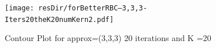\documentclass[12pt]{article}
\begin{document}









\begin{figure}
  \centering
\ifmacosx
  \texttt{[image: resDir/forBetterRBC--3,3,3-Iters20theK20numKern2.pdf]}
  \fi
  \caption{Contour Plot for approx=(3,3,3) 20 iterations and K =20}
  \label{fig:cntpltI}
\end{figure}
\end{document}
